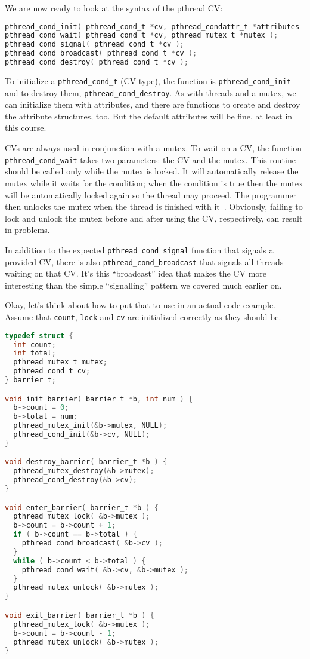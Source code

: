 We are now ready to look at the syntax of the pthread CV:

\begin{lstlisting}[language=C]
pthread_cond_init( pthread_cond_t *cv, pthread_condattr_t *attributes );
pthread_cond_wait( pthread_cond_t *cv, pthread_mutex_t *mutex );
pthread_cond_signal( pthread_cond_t *cv );
pthread_cond_broadcast( pthread_cond_t *cv );
pthread_cond_destroy( pthread_cond_t *cv );
\end{lstlisting}

To initialize a \texttt{pthread\_cond\_t} (CV type), the function is \texttt{pthread\_cond\_init} and to destroy them, \texttt{pthread\_cond\_destroy}. As with threads and a mutex, we can initialize them with attributes, and there are functions to create and destroy the attribute structures, too. But the default attributes will be fine, at least in this course.

CVs are always used in conjunction with a mutex. To wait on a CV, the function \texttt{pthread\_cond\_wait} takes two parameters: the CV and the mutex. This routine should be called only while the mutex is locked. It will automatically release the mutex while it waits for the condition; when the condition is true then the mutex will be automatically locked again so the thread may proceed. The programmer then unlocks the mutex when the thread is finished with it~\cite{pthreads}. Obviously, failing to lock and unlock the mutex before and after using the CV, respectively, can result in problems.

In addition to the expected \texttt{pthread\_cond\_signal} function that signals a provided CV, there is also \texttt{pthread\_cond\_broadcast} that signals all threads waiting on that CV. It's this ``broadcast'' idea that makes the CV more interesting than the simple ``signalling'' pattern we covered much earlier on.

Okay, let's think about how to put that to use in an actual code example. Assume that \texttt{count}, \texttt{lock} and \texttt{cv} are initialized correctly as they should be.

\newpage

\begin{lstlisting}[language=C]
typedef struct {
  int count;
  int total;
  pthread_mutex_t mutex;
  pthread_cond_t cv;
} barrier_t;

void init_barrier( barrier_t *b, int num ) {
  b->count = 0;
  b->total = num;
  pthread_mutex_init(&b->mutex, NULL);
  pthread_cond_init(&b->cv, NULL);
}

void destroy_barrier( barrier_t *b ) {
  pthread_mutex_destroy(&b->mutex);
  pthread_cond_destroy(&b->cv);
}

void enter_barrier( barrier_t *b ) {
  pthread_mutex_lock( &b->mutex );
  b->count = b->count + 1;
  if ( b->count == b->total ) {
    pthread_cond_broadcast( &b->cv );
  }
  while ( b->count < b->total ) {
    pthread_cond_wait( &b->cv, &b->mutex );
  }
  pthread_mutex_unlock( &b->mutex );
}

void exit_barrier( barrier_t *b ) {
  pthread_mutex_lock( &b->mutex );
  b->count = b->count - 1;
  pthread_mutex_unlock( &b->mutex );
}
\end{lstlisting}

